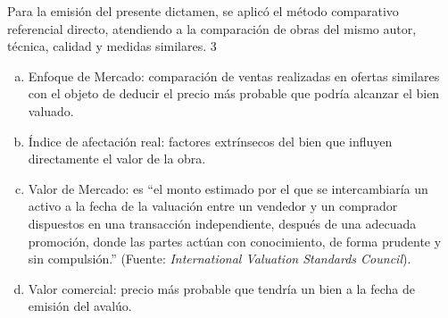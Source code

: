 Para la emisi\'on del presente dictamen, se aplic\'o el m\'etodo comparativo referencial directo, atendiendo a la comparaci\'on de obras del mismo autor, t\'ecnica, calidad y medidas similares.
3\\
\begin{enumerate}[a.]
\item Enfoque de Mercado: comparaci\'on de ventas realizadas en ofertas similares con el objeto de deducir el precio m\'as probable que podr\'ia alcanzar el bien valuado.

\item \'Indice de afectaci\'on real: factores extr\'insecos del bien que influyen directamente el valor de la obra.

\item Valor de Mercado: es ``el monto estimado por el que se intercambiar\'ia un activo a la fecha de la valuaci\'on entre un vendedor y un comprador dispuestos en una transacci\'on independiente, despu\'es de una adecuada promoci\'on, donde las partes act\'uan con conocimiento, de forma prudente y sin compulsi\'on.'' (Fuente: \textit{International Valuation Standards Council}).

\item Valor comercial: precio m\'as probable que tendr\'ia un bien a la fecha de emisi\'on del aval\'uo.

\end{enumerate}